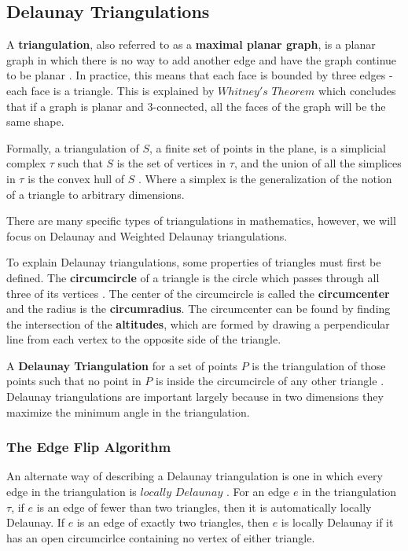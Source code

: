\documentclass[11pt]{article}
\begin{document}
\subsection{Delaunay Triangulations}
	A \textbf{triangulation}, also referred to as a \textbf{maximal planar graph}, is a planar graph in which there is no way to add another edge and have the graph continue to be planar \cite{meshGeneration}. In practice, this means that each face is bounded by three edges - each face is a triangle. This is explained by $Whitney's$ $Theorem$ which concludes that if a graph is planar and 3-connected, all the faces of the graph will be the same shape.

Formally, a triangulation of $S$, a finite set of points in the plane, is a simplicial complex $\tau$ such that $S$ is the set of vertices in $\tau$, and the union of all the simplices in $\tau$ is the convex hull of $S$ \cite{meshGeneration}. Where a simplex is the generalization of the notion of a triangle to arbitrary dimensions.

There are many specific types of triangulations in mathematics, however, we will focus on Delaunay and Weighted Delaunay triangulations.

To explain Delaunay triangulations, some properties of triangles must first be defined. The \textbf{circumcircle} of a triangle is the circle which passes through all three of its vertices \cite{mathworld:Circumcenter}. The center of the circumcircle is called the \textbf{circumcenter} and the radius is the \textbf{circumradius}. The circumcenter can be found by finding the intersection of the \textbf{altitudes}, which are formed by drawing a perpendicular line from each vertex to the opposite side of the triangle.
  
A \textbf{Delaunay Triangulation} for a set of points $P$ is the triangulation of those points such that no point in $P$ is inside the circumcircle of any other triangle \cite{meshGeneration}. Delaunay triangulations are important largely because in two dimensions they maximize the minimum angle in the triangulation.

\subsubsection{The Edge Flip Algorithm}
An alternate way of describing a Delaunay triangulation is one in which every edge in the triangulation is $locally$ $Delaunay$ \cite{meshGeneration}. For an edge $e$ in the triangulation $\tau$, if $e$ is an edge of fewer than two triangles, then it is automatically locally Delaunay. If $e$ is an edge of exactly two triangles, then $e$ is locally Delaunay if it has an open circumcirlce containing no vertex of either triangle. 
\end{document}
